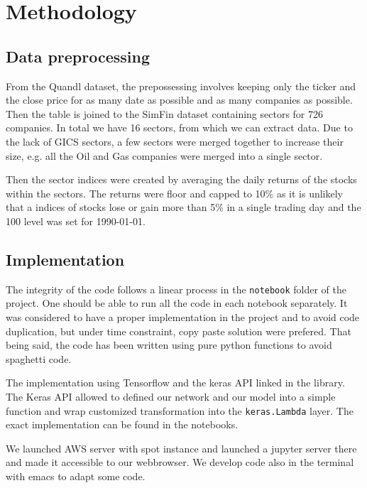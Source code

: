 \documentclass[a4paper,twoside]{article}
\begin{document}
\section{Methodology}
\label{sec:orgdb3cd2d}

\subsection{Data preprocessing}
\label{sec:org3a39f6d}

From the Quandl dataset, the prepossessing involves keeping only the ticker
and the close price for as many date as possible and as many companies as
possible. Then the table is joined to the SimFin dataset containing sectors
for 726 companies. In total we have 16 sectors, from which we can extract
data. Due to the lack of GICS sectors, a few sectors were merged together to
increase their size, e.g. all the Oil and Gas companies were merged into a
single sector.

Then the sector indices were created by averaging the daily returns of the
stocks within the sectors. The returns were floor and capped to 10\% as it is
unlikely that a indices of stocks lose or gain more than 5\% in a single
trading day and the 100 level was set for 1990-01-01.

\subsection{Implementation}
\label{sec:org0b799ed}

The integrity of the code follows a linear process in the \texttt{notebook} folder
of the project. One should be able to run all the code in each notebook
separately. It was considered to have a proper implementation in the project
and to avoid code duplication, but under time constraint, copy paste solution
were prefered. That being said, the code has been written using pure python
functions to avoid spaghetti code.

The implementation using Tensorflow and the keras API linked in the library.
The Keras API allowed to defined our network and our model into a simple
function and wrap customized transformation into the \texttt{keras.Lambda} layer.
The exact implementation can be found in the notebooks.

We launched AWS server with spot instance and launched a jupyter server there
and made it accessible to our webbrowser. We develop code also in the
terminal with emacs to adapt some code. 
\end{document}
